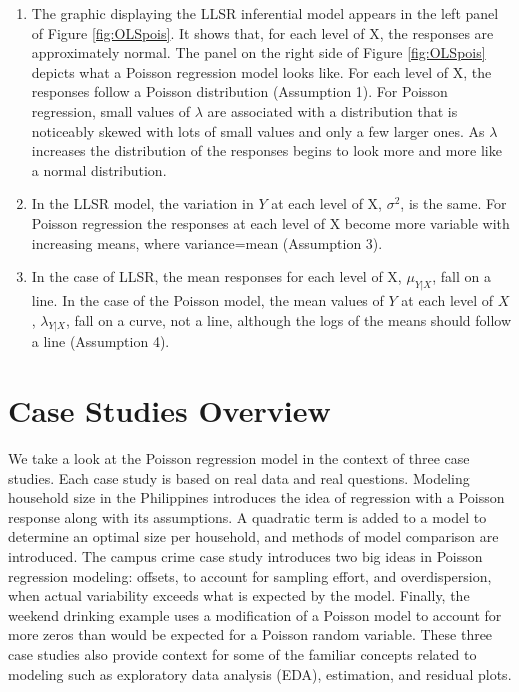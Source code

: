 \documentclass[
]{krantz}
\providecommand{\tightlist}{%
  \setlength{\itemsep}{0pt}\setlength{\parskip}{0pt}}
\begin{document}
\begin{enumerate}
\def\labelenumi{\arabic{enumi}.}
\tightlist
\item
  The graphic displaying the LLSR inferential model appears in the left panel of Figure \ref{fig:OLSpois}. It shows that, for each level of X, the responses are approximately normal. The panel on the right side of Figure \ref{fig:OLSpois} depicts what a Poisson regression model looks like. For each level of X, the responses follow a Poisson distribution (Assumption 1). For Poisson regression, small values of \(\lambda\) are associated with a distribution that is noticeably skewed with lots of small values and only a few larger ones. As \(\lambda\) increases the distribution of the responses begins to look more and more like a normal distribution.
\item
  In the LLSR model, the variation in \(Y\) at each level of X, \(\sigma^2\), is the same. For Poisson regression the responses at each level of X become more variable with increasing means, where variance=mean (Assumption 3).
\item
  In the case of LLSR, the mean responses for each level of X, \(\mu_{Y|X}\), fall on a line. In the case of the Poisson model, the mean values of \(Y\) at each level of \(X\), \(\lambda_{Y|X}\), fall on a curve, not a line, although the logs of the means should follow a line (Assumption 4).
\end{enumerate}

\hypertarget{case-studies-overview}{%
\section{Case Studies Overview}\label{case-studies-overview}}

We take a look at the Poisson regression model in the context of three case studies. Each case study is based on real data and real questions. Modeling household size in the Philippines introduces the idea of regression with a Poisson response along with its assumptions. A quadratic term is added to a model to determine an optimal size per household, and methods of model comparison are introduced. The campus crime case study introduces two big ideas in Poisson regression modeling: offsets, to account for sampling effort, and overdispersion, when actual variability exceeds what is expected by the model. Finally, the weekend drinking example uses a modification of a Poisson model to account for more zeros than would be expected for a Poisson random variable. These three case studies also provide context for some of the familiar concepts related to modeling such as exploratory data analysis (EDA), estimation, and residual plots.
\end{document}
